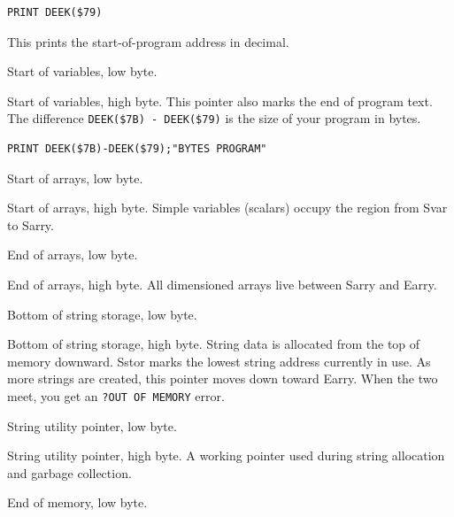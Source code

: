 \begin{lstlisting}
PRINT DEEK($79)
\end{lstlisting}

This prints the start-of-program address in decimal.


Start of variables, low byte.


Start of variables, high byte.  This pointer also marks the end of program
text.  The difference \texttt{DEEK(\$7B) - DEEK(\$79)} is the size of your
program in bytes.

\begin{lstlisting}
PRINT DEEK($7B)-DEEK($79);"BYTES PROGRAM"
\end{lstlisting}


Start of arrays, low byte.


Start of arrays, high byte.  Simple variables (scalars) occupy the region
from Svar to Sarry.


End of arrays, low byte.


End of arrays, high byte.  All dimensioned arrays live between Sarry and
Earry.


Bottom of string storage, low byte.


Bottom of string storage, high byte.  String data is allocated from the top of
memory downward.  Sstor marks the lowest string address currently in use.  As
more strings are created, this pointer moves down toward Earry.  When the two
meet, you get an \texttt{?OUT OF MEMORY} error.


String utility pointer, low byte.


String utility pointer, high byte.  A working pointer used during string
allocation and garbage collection.


End of memory, low byte.

